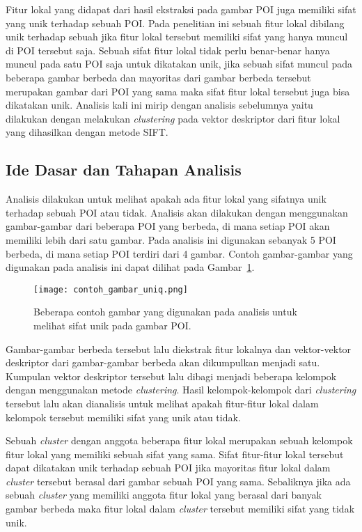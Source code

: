 \label{sec:analisis_keunikan}
Fitur lokal yang didapat dari hasil ekstraksi pada gambar POI juga memiliki sifat yang unik terhadap sebuah POI. Pada penelitian ini sebuah fitur lokal dibilang unik terhadap sebuah jika fitur lokal tersebut memiliki sifat yang hanya muncul di POI tersebut saja. Sebuah sifat fitur lokal tidak perlu benar-benar hanya muncul pada satu POI saja untuk dikatakan unik, jika sebuah sifat muncul pada beberapa gambar berbeda dan mayoritas dari gambar berbeda tersebut merupakan gambar dari POI yang sama maka sifat fitur lokal tersebut juga bisa dikatakan unik. Analisis kali ini mirip dengan analisis sebelumnya yaitu dilakukan dengan melakukan \textit{clustering} pada vektor deskriptor dari fitur lokal yang dihasilkan dengan metode SIFT.

\subsection{Ide Dasar dan Tahapan Analisis}
Analisis dilakukan untuk melihat apakah ada fitur lokal yang sifatnya unik terhadap sebuah POI atau tidak. Analisis akan dilakukan dengan menggunakan gambar-gambar dari beberapa POI yang berbeda, di mana setiap POI akan memiliki lebih dari satu gambar. Pada analisis ini digunakan sebanyak 5 POI berbeda, di mana setiap POI terdiri dari 4 gambar. Contoh gambar-gambar yang digunakan pada analisis ini dapat dilihat pada Gambar~\ref{fig:analisis_uniqueness}. 
\begin{figure}[H]
	\centering
	\texttt{[image: contoh\_gambar\_uniq.png]}	
	\caption{Beberapa contoh gambar yang digunakan pada analisis untuk melihat sifat unik pada gambar POI.}
	\label{fig:analisis_uniqueness}
\end{figure}

Gambar-gambar berbeda tersebut lalu diekstrak fitur lokalnya dan vektor-vektor deskriptor dari gambar-gambar berbeda akan dikumpulkan menjadi satu. Kumpulan vektor deskriptor tersebut lalu dibagi menjadi beberapa kelompok dengan menggunakan metode \textit{clustering}. Hasil kelompok-kelompok dari \textit{clustering} tersebut lalu akan dianalisis untuk melihat apakah fitur-fitur lokal dalam kelompok tersebut memiliki sifat yang unik atau tidak.

Sebuah \textit{cluster} dengan anggota beberapa fitur lokal merupakan sebuah kelompok fitur lokal yang memiliki sebuah sifat yang sama. Sifat fitur-fitur lokal tersebut dapat dikatakan unik terhadap sebuah POI jika mayoritas fitur lokal dalam \textit{cluster} tersebut berasal dari gambar sebuah POI yang sama. Sebaliknya jika ada sebuah \textit{cluster} yang memiliki anggota fitur lokal yang berasal dari banyak gambar berbeda maka fitur lokal dalam \textit{cluster} tersebut memiliki sifat yang tidak unik.

